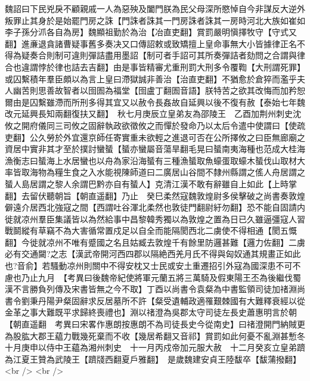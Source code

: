 魏詔曰下民兇戾不顧親戚一人為惡殃及闔門朕為民父母深所愍悼自今非謀反大逆外叛罪止其身於是始罷門房之誅【門誅者誅其一門房誅者誅其一房時河北大族如崔如李子孫分沠各自為房】魏顯祖勤於為治【冶直吏翻】賞罰嚴明愼擇牧守【守式又翻】進亷退貪諸曹疑事舊多奏决又口傳詔敕或致矯擅上皇命事無大小皆據律正名不得為疑奏合則制可違則彈詰盡用墨詔【制可者手詔可其所奏彈詰者劾問之合謂與律合也違謂悖於律也詰去吉翻】由是事皆精審尤重刑罰大刑多令覆鞫【大刑謂死罪】或囚繫積年羣臣頗以為言上皇曰滯獄誠非善治【治直吏翻】不猶愈於倉猝而濫乎夫人幽苦則思善故智者以囹圄為福堂【囹盧丁翻圄音語】朕特苦之欲其改悔而加矜恕爾由是囚繫雖滯而所刑多得其宜又以赦令長姦故自延興以後不復有赦【泰始七年魏改元延興長知兩翻復扶又翻】　秋七月庚辰立皇弟友為邵陵王　乙酉加荆州刺史沈攸之開府儀同三司攸之固辭執政欲徵攸之而憚於發命乃以太后令遣中使謂曰【使疏吏翻】公久勞於外宜還京師任寄實重未欲輕之進退可否在公所擇攸之曰臣無廊廟之資居中實非其才至於撲討蠻蜑【蜑亦蠻屬音蕩旱翻毛晃曰蜑南夷海種也范成大桂海漁衡志曰蜑海上水居蠻也以舟為家沿海蜑有三種漁蜑取魚蠔蛋取蠔木蜑伐山取材大率皆取海物為糧生食之入水能視陳師道曰二廣居山谷間不隸州縣謂之傜人舟居謂之蜑人島居謂之黎人余謂巴黔亦自有蜑人】克清江漢不敢有辭雖自上如此【上時掌翻】去留伏聽朝旨【朝直遥翻】乃止　癸巳柔然寇魏敦煌尉多侯擊破之尚書奏敦煌僻遠介居西北強寇之間【西謂吐谷渾北柔然也敦徒門翻尉紆勿翻】恐不能自固請内徙就凉州羣臣集議皆以為然給事中昌黎韓秀獨以為敦煌之置為日已久雖逼彊寇人習戰鬬縱有草竊不為大害循常置戍足以自全而能隔閡西北二虜使不得相通【閡五慨翻】今徙就凉州不唯有蹙國之名且姑臧去敦煌千有餘里防邏甚難【邏力佐翻】二虜必有交通闚?之志【漢武帝開河西四郡以隔絶西羌月氏不得與匈奴通其規畫正如此也?音俞】若騷動凉州則關中不得安枕又士民或安土重遷招引外寇為國深患不可不慮也乃止九月　【考異曰後魏帝紀使將軍元蘭五將三萬騎及假東陽王丕為後繼伐蜀漢不言勝負列傳及宋書皆無之今不取】丁酉以尚書令袁粲為中書監領司徒加禇淵尚書令劉秉丹陽尹粲固辭求反居墓所不許【粲受遺輔政適罹艱棘國有大難釋衰經以從金革之事大難既平求歸終喪禮也】淵以禇澄為吳郡太守司徒左長史蕭惠明言於朝【朝直遥翻　考異曰宋畧作惠朗按惠朗不為司徒長史今從南史】曰禇澄開門納賊更為股肱大郡王藴力戰幾死棄而不收【幾居希翻又音祁】賞罰如此何憂不亂淵甚慙冬十月庚申以侍中王藴為湘州刺史　十一月丙戍帝加元服大赦　十二月癸亥立皇弟躋為江夏王贊為武陵王【躋牋西翻夏戶雅翻】　是歲魏建安貞王陸馛卒【馛蒲撥翻】<br />
<br />
